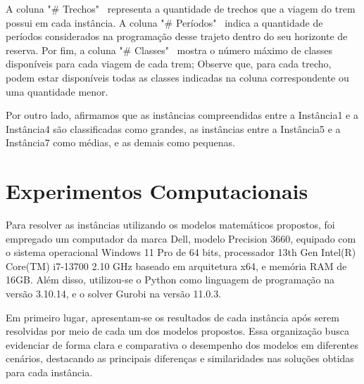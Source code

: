A coluna "\# Trechos" \, representa a quantidade de trechos que a viagem do trem possui em cada instância. A coluna "\# Períodos" \, indica a quantidade de períodos considerados na programação desse trajeto dentro do seu horizonte de reserva. Por fim, a coluna "\# Classes" \, mostra o número máximo de classes disponíveis para cada viagem de cada trem; Observe que, para cada trecho, podem estar disponíveis todas as classes indicadas na coluna correspondente ou uma quantidade menor.

Por outro lado, afirmamos que as instâncias compreendidas entre a Instância1 e a Instância4 são classificadas como grandes, as instâncias entre a Instância5 e a Instância7 como médias, e as demais como pequenas.

\section{Experimentos Computacionais}
Para resolver as instâncias utilizando os modelos matemáticos propostos, foi empregado um computador da marca Dell, modelo Precision 3660, equipado com o sistema operacional Windows 11 Pro de 64 bits, processador 13th Gen Intel(R) Core(TM) i7-13700 2.10 GHz baseado em arquitetura x64, e memória RAM de 16GB. Além disso, utilizou-se o Python como linguagem de programação na versão 3.10.14, e o solver Gurobi na versão 11.0.3.

Em primeiro lugar, apresentam-se os resultados de cada instância após serem resolvidas por meio de cada um dos modelos propostos. Essa organização busca evidenciar de forma clara e comparativa o desempenho dos modelos em diferentes cenários, destacando as principais diferenças e similaridades nas soluções obtidas para cada instância.

